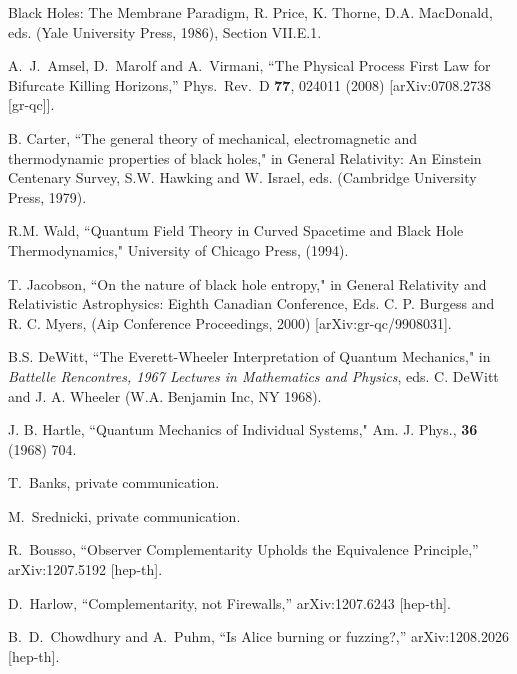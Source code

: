 \documentclass[12pt]{article}
\begin{document}
\begin{thebibliography}{99}
Black Holes: The Membrane Paradigm, R. Price, K. Thorne, D.A. MacDonald, eds. (Yale
University Press, 1986), Section VII.E.1.

  A.~J.~Amsel, D.~Marolf and A.~Virmani,
  ``The Physical Process First Law for Bifurcate Killing Horizons,''
  Phys.\ Rev.\ D {\bf 77}, 024011 (2008)
  [arXiv:0708.2738 [gr-qc]].


  B. Carter, ``The general theory of mechanical, electromagnetic and thermodynamic properties
of black holes," in General Relativity: An Einstein Centenary Survey, S.W. Hawking and W.
Israel, eds. (Cambridge University Press, 1979).

R.M. Wald, ``Quantum Field Theory in Curved Spacetime and Black Hole Thermodynamics,"
University of Chicago Press, (1994).

T. Jacobson, ``On the nature of black hole entropy," in General Relativity and Relativistic Astrophysics: Eighth Canadian Conference, Eds. C. P. Burgess and R. C. Myers, (Aip Conference
Proceedings, 2000) [arXiv:gr-qc/9908031].

 B.S. DeWitt, ``The Everett-Wheeler Interpretation of Quantum Mechanics," in {\it Battelle Rencontres, 1967 Lectures in Mathematics and Physics}, eds. C. DeWitt and J. A. Wheeler (W.A. Benjamin Inc, NY 1968).

    J. B. Hartle, ``Quantum Mechanics of Individual Systems," Am. J. Phys., {\bf 36} (1968) 704.


T.~Banks, private communication.

M.~Srednicki, private communication.

  R.~Bousso,
  ``Observer Complementarity Upholds the Equivalence Principle,''
  arXiv:1207.5192 [hep-th].

  D.~Harlow,
  ``Complementarity, not Firewalls,''
  arXiv:1207.6243 [hep-th].

  B.~D.~Chowdhury and A.~Puhm,
  ``Is Alice burning or fuzzing?,''
  arXiv:1208.2026 [hep-th].

\end{thebibliography}
\end{document}
